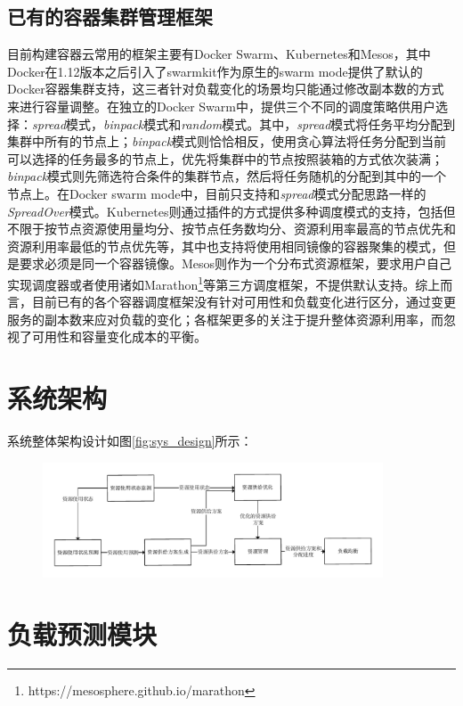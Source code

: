 \subsection{已有的容器集群管理框架}
目前构建容器云常用的框架主要有Docker Swarm、Kubernetes和Mesos，其中Docker在1.12版本之后引入了swarmkit作为原生的swarm mode提供了默认的Docker容器集群支持，这三者针对负载变化的场景均只能通过修改副本数的方式来进行容量调整。在独立的Docker Swarm中，提供三个不同的调度策略供用户选择：\emph{spread}模式，\emph{binpack}模式和\emph{random}模式。其中，\emph{spread}模式将任务平均分配到集群中所有的节点上；\emph{binpack}模式则恰恰相反，使用贪心算法将任务分配到当前可以选择的任务最多的节点上，优先将集群中的节点按照装箱的方式依次装满；\emph{binpack}模式则先筛选符合条件的集群节点，然后将任务随机的分配到其中的一个节点上。在Docker swarm mode中，目前只支持和\emph{spread}模式分配思路一样的\emph{SpreadOver}模式。Kubernetes则通过插件的方式提供多种调度模式的支持，包括但不限于按节点资源使用量均分、按节点任务数均分、资源利用率最高的节点优先和资源利用率最低的节点优先等，其中也支持将使用相同镜像的容器聚集的模式，但是要求必须是同一个容器镜像。Mesos则作为一个分布式资源框架，要求用户自己实现调度器或者使用诸如Marathon\footnote{https://mesosphere.github.io/marathon}等第三方调度框架，不提供默认支持。综上而言，目前已有的各个容器调度框架没有针对可用性和负载变化进行区分，通过变更服务的副本数来应对负载的变化；各框架更多的关注于提升整体资源利用率，而忽视了可用性和容量变化成本的平衡。

\section{系统架构}
系统整体架构设计如图\ref{fig:sys_design}所示：
\begin{figure}[htbp]
\centering
\includegraphics[width=0.9\textwidth]{./figure/sys_design}
\end{figure}


\section{负载预测模块}

